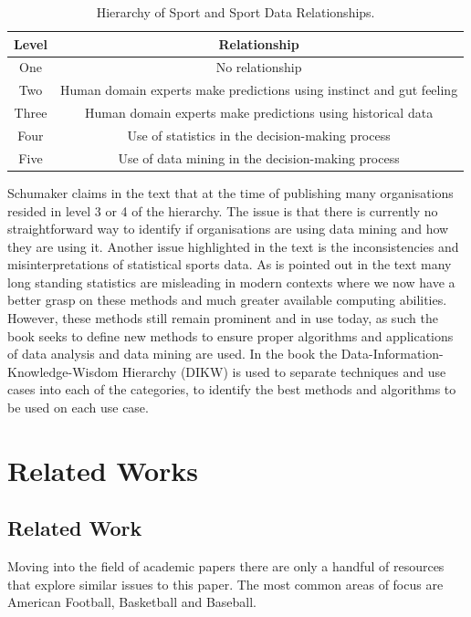 \documentclass{imc-inf}
\begin{document}
	\begin{table}[h!]
		\centering	
		\begin{tabular}{| c | c |}
			\hline
			Level & Relationship\\
			\hline
			One & No relationship \\
			\hline
			Two & Human domain experts make predictions using instinct and gut feeling \\
			\hline
			Three & Human domain experts make predictions using historical data \\
			\hline
			Four & Use of statistics in the decision-making process \\
			\hline
			Five & Use of data mining in the decision-making process  \\
			\hline			
		\end{tabular}
		\caption{\label {tab:Sport Data Relation}Hierarchy of Sport and Sport Data Relationships.}		
	\end{table}
	
	Schumaker claims in the text that at the time of publishing many organisations resided in level 3 or 4 of the hierarchy.  The issue is that there is currently no straightforward way to identify if organisations are using data mining and how they are using it. 
	Another issue highlighted in the text is the inconsistencies and misinterpretations of statistical sports data. As is pointed out in the text many long standing statistics are misleading in modern contexts where we now have a better grasp on these methods and much greater available computing abilities. However, these methods still remain prominent and in use today, as such the book seeks to define new methods to ensure proper algorithms and applications of data analysis and data mining are used. 
	In the book the Data-Information-Knowledge-Wisdom Hierarchy (DIKW) is used to separate techniques and use cases into each of the categories, to identify the best methods and algorithms to be used on each use case. 
	
	\newpage
	\chapter{Related Works}\label{chap:relatedworks}
	\section{Related Work}
	Moving into the field of academic papers there are only a handful of resources that explore similar issues to this paper. The most common areas of focus are American Football, Basketball and Baseball. 
	
\end{document}
